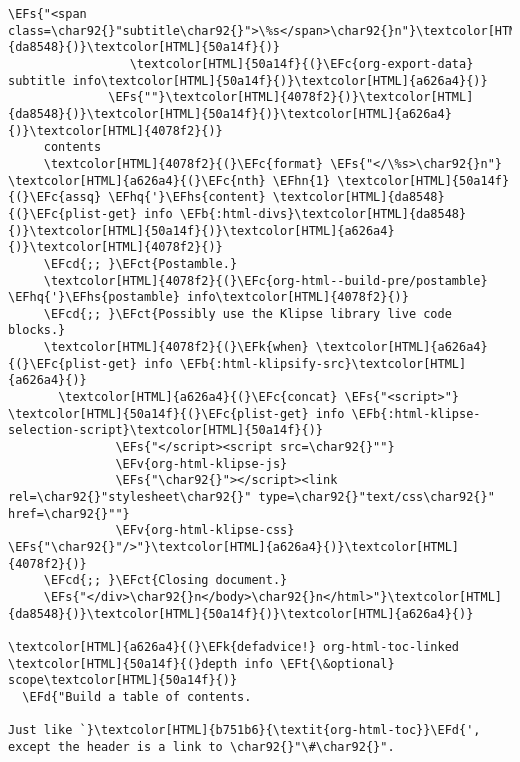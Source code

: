 \documentclass{scrartcl}
\newcommand{\EFk}[1]{\textcolor{EFk}{#1}} %
\newcommand{\EFd}[1]{\textcolor{EFd}{\textit{#1}}} %
\newcommand{\EFt}[1]{\textcolor{EFt}{#1}} %
\newcommand{\EFs}[1]{\textcolor{EFs}{#1}} %
\newcommand{\EFb}[1]{\textcolor{EFb}{#1}} %
\newcommand{\EFct}[1]{\textcolor{EFct}{#1}} %
\newcommand{\EFc}[1]{\textcolor{EFc}{#1}} %
\newcommand{\EFv}[1]{\textcolor{EFv}{#1}} %
\newcommand{\EFcd}[1]{\textcolor{EFcd}{#1}} %
\newcommand{\EFhn}[1]{\textcolor{EFhn}{\textbf{#1}}} %
\newcommand{\EFhq}[1]{\textcolor{EFhq}{#1}} %
\newcommand{\EFhs}[1]{\textcolor{EFhs}{#1}} %
\begin{document}
\begin{Code}
\begin{Verbatim}[]
                           \EFs{"<span class=\char92{}"subtitle\char92{}">\%s</span>\char92{}n"}\textcolor[HTML]{da8548}{)}\textcolor[HTML]{50a14f}{)}
                 \textcolor[HTML]{50a14f}{(}\EFc{org-export-data} subtitle info\textcolor[HTML]{50a14f}{)}\textcolor[HTML]{a626a4}{)}
              \EFs{""}\textcolor[HTML]{4078f2}{)}\textcolor[HTML]{da8548}{)}\textcolor[HTML]{50a14f}{)}\textcolor[HTML]{a626a4}{)}\textcolor[HTML]{4078f2}{)}
     contents
     \textcolor[HTML]{4078f2}{(}\EFc{format} \EFs{"</\%s>\char92{}n"} \textcolor[HTML]{a626a4}{(}\EFc{nth} \EFhn{1} \textcolor[HTML]{50a14f}{(}\EFc{assq} \EFhq{'}\EFhs{content} \textcolor[HTML]{da8548}{(}\EFc{plist-get} info \EFb{:html-divs}\textcolor[HTML]{da8548}{)}\textcolor[HTML]{50a14f}{)}\textcolor[HTML]{a626a4}{)}\textcolor[HTML]{4078f2}{)}
     \EFcd{;; }\EFct{Postamble.}
     \textcolor[HTML]{4078f2}{(}\EFc{org-html--build-pre/postamble} \EFhq{'}\EFhs{postamble} info\textcolor[HTML]{4078f2}{)}
     \EFcd{;; }\EFct{Possibly use the Klipse library live code blocks.}
     \textcolor[HTML]{4078f2}{(}\EFk{when} \textcolor[HTML]{a626a4}{(}\EFc{plist-get} info \EFb{:html-klipsify-src}\textcolor[HTML]{a626a4}{)}
       \textcolor[HTML]{a626a4}{(}\EFc{concat} \EFs{"<script>"} \textcolor[HTML]{50a14f}{(}\EFc{plist-get} info \EFb{:html-klipse-selection-script}\textcolor[HTML]{50a14f}{)}
               \EFs{"</script><script src=\char92{}""}
               \EFv{org-html-klipse-js}
               \EFs{"\char92{}"></script><link rel=\char92{}"stylesheet\char92{}" type=\char92{}"text/css\char92{}" href=\char92{}""}
               \EFv{org-html-klipse-css} \EFs{"\char92{}"/>"}\textcolor[HTML]{a626a4}{)}\textcolor[HTML]{4078f2}{)}
     \EFcd{;; }\EFct{Closing document.}
     \EFs{"</div>\char92{}n</body>\char92{}n</html>"}\textcolor[HTML]{da8548}{)}\textcolor[HTML]{50a14f}{)}\textcolor[HTML]{a626a4}{)}

\textcolor[HTML]{a626a4}{(}\EFk{defadvice!} org-html-toc-linked \textcolor[HTML]{50a14f}{(}depth info \EFt{\&optional} scope\textcolor[HTML]{50a14f}{)}
  \EFd{"Build a table of contents.

Just like `}\textcolor[HTML]{b751b6}{\textit{org-html-toc}}\EFd{', except the header is a link to \char92{}"\#\char92{}".


\end{Verbatim}
\end{Code}
\end{document}
